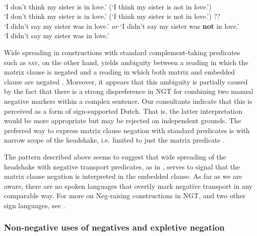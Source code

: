 \documentclass[output=paper,colorlinks,citecolor=brown]{langscibook}
\begin{document}
\ea\label{ex:ngt:neg-transport}
    \ea\label{ex:ngt:neg-transport-think}   \\ `I don't think my sister is in love.'  (\approx `I think my sister is not in love.')
     \ex\label{ex:ngt:neg-transport-think2}    \\ `I don't think my sister is in love.' (\approx `I think my sister is not in love.')
    \ex\label{ex:ngt:neg-transport-say} ??   \\ `I didn't say my sister was in love.' \textit{or} `I didn't say my sister was \textbf{not} in love.'
    \ex\label{ex:ngt:neg-transport-say-narrow}    \\ `I didn't say my sister was in love.'
    \z
\z

Wide spreading in constructions with standard complement-taking predicates such as \textsc{say}, on the other hand, yields ambiguity between a reading in which the matrix clause is negated and a reading in which both matrix and embedded clause are negated . Moreover, it appears that this ambiguity is partially caused by the fact that there is a strong dispreference in NGT for combining two manual negative markers within a complex sentence. Our consultants indicate that this is perceived as a form of sign-supported Dutch. That is, the latter interpretation would be more appropriate but may be rejected on independent grounds. The preferred way to express matrix clause negation with standard predicates is with narrow scope of the headshake, i.e. limited to just the matrix predicate .

The pattern described above seems to suggest that wide spreading of the headshake with negative transport predicates, as in , serves to signal that the matrix clause negation is interpreted in the embedded clause. As far as we are aware, there are no spoken languages that overtly mark negative transport in any comparable way.
For more on Neg-raising constructions in NGT, and two other sign languages, see \citealt{OomenEtAl2023}.

\subsubsection{Non-negative uses of negatives and expletive negation} 
\end{document}
